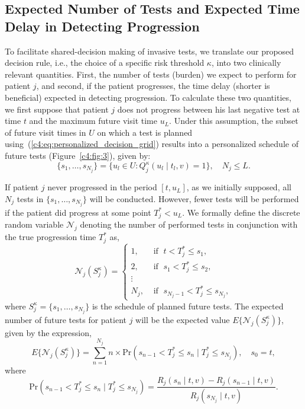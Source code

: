 \subsection{Expected Number of Tests and Expected Time Delay in Detecting Progression}
\label{c4:subsec:exp_delay_estimation}
To facilitate shared-decision making of invasive tests, we translate our proposed decision rule, i.e., the choice of a specific risk threshold $\kappa$, into two clinically relevant quantities. First, the number of tests (burden) we expect to perform for patient $j$, and second, if the patient progresses, the time delay (shorter is beneficial) expected in detecting progression. To calculate these two quantities, we first suppose that patient $j$ does not progress between his last negative test at time $t$ and the maximum future visit time $u_L$. Under this assumption, the subset of future visit times in $U$ on which a test is planned using~(\ref{c4:eq:personalized_decision_grid}) results into a personalized schedule of future tests (Figure~\ref{c4:fig:3}), given by:
\begin{equation}
\label{c4:eq:personalized_schedule_grid}
\{s_1, \ldots, s_{N_j}\} = \big\{ u_l \in U : Q_j^\kappa(u_l \mid t_l, v) = 1 \big\}, \quad N_j \leq L.
\end{equation}

If patient $j$ never progressed in the period $[t, u_L]$, as we initially supposed, all $N_j$ tests in $\{s_1, \ldots, s_{N_j}\}$ will be conducted. However, fewer tests will be performed if the patient did progress at some point $T_j^* < u_L$. We formally define the discrete random variable $\mathcal{N}_j$ denoting the number of performed tests in conjunction with the true progression time $T_j^*$ as,
\[
\mathcal{N}_j (S^\kappa_j) = \left \{
\begin{array}{ll}
1, & \mbox{ if } \; t < T^*_j \leq s_1,\\
2, & \mbox{ if } \; s_1 < T^*_j \leq s_2,\\
\vdots&\\
N_j, & \mbox{ if } \; s_{N_j-1} < T^*_j \leq s_{N_j},
\end{array}
\right.
\]
where $S^\kappa_j = \{s_1, \ldots, s_{N_j}\}$ is the schedule of planned future tests. The expected number of future tests for patient $j$ will be the expected value $E \big \{\mathcal N_j(S^\kappa_j)\big\}$, given by the expression,
\begin{equation*}
\label{c4:eq:exp_tests}
E \big \{\mathcal N_j(S^\kappa_j)\big\} = \sum_{n = 1}^{N_j} n \times \mbox{Pr}(s_{n-1} < T^*_j \leq s_n \mid T^*_j \leq s_{N_j}), \quad s_0 = t,
\end{equation*}
where 
\begin{equation*}
\mbox{Pr}(s_{n-1} < T^*_j \leq s_n \mid T^*_j \leq s_{N_j}) = \frac{R_j(s_n \mid t, v) - R_j(s_{n-1} \mid t, v)}{R_j(s_{N_j} \mid t, v)}.
\end{equation*}

